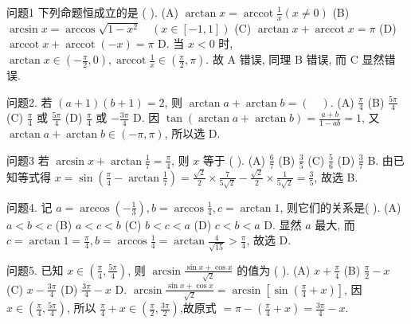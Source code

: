 
问题1 下列命题恒成立的是 ( ).
(A) $\arctan x=\operatorname{arccot} \frac{1}{x}(x \neq 0)$
(B) $\arcsin x=\arccos \sqrt{1-x^2} \quad(x \in[-1,1])$
(C) $\arctan x+\operatorname{arccot} x=\pi$
(D) $\operatorname{arccot} x+\operatorname{arccot}(-x)=\pi$
D. 当 $x<0$ 时, $\arctan x \in\left(-\frac{\pi}{2}, 0\right), \operatorname{arccot} \frac{1}{x} \in\left(\frac{\pi}{2}, \pi\right)$. 故 A 错误, 同理 B 错误, 而 C 显然错误.



问题2. 若 $(a+1)(b+1)=2$, 则 $\arctan a+\arctan b=(\quad)$.
(A) $\frac{\pi}{4}$
(B) $\frac{5 \pi}{4}$
(C) $\frac{\pi}{4}$ 或 $\frac{5 \pi}{4}$
(D) $\frac{\pi}{4}$ 或 $-\frac{3 \pi}{4}$
D. 因 $\tan (\arctan a+\arctan b)=\frac{a+b}{1-a b}=1$, 又 $\arctan a+\arctan b \in (-\pi, \pi)$, 所以选 D.



问题3 若 $\arcsin x+\arctan \frac{1}{7}=\frac{\pi}{4}$, 则 $x$ 等于 ( ).
(A) $\frac{6}{7}$
(B) $\frac{3}{5}$
(C) $\frac{5}{6}$
(D) $\frac{3}{7}$
B. 由已知等式得 $x=\sin \left(\frac{\pi}{4}-\arctan \frac{1}{7}\right)=\frac{\sqrt{2}}{2} \times \frac{7}{5 \sqrt{2}}-\frac{\sqrt{2}}{2} \times \frac{1}{5 \sqrt{2}}= \frac{3}{5}$, 故选 B.



问题4. 记 $a=\arccos \left(-\frac{1}{3}\right), b=\arccos \frac{1}{4}, c=\arctan 1$, 则它们的关系是( ).
(A) $a<b<c$
(B) $a<c<b$
(C) $b<c<a$
(D) $c<b<a$
D. 显然 $a$ 最大, 而 $c=\arctan 1=\frac{\pi}{4}, b=\arccos \frac{1}{4}=\arctan \frac{4}{\sqrt{15}}> \frac{\pi}{4}$, 故选 D.



问题5. 已知 $x \in\left(\frac{\pi}{4}, \frac{5 \pi}{4}\right)$, 则 $\arcsin \frac{\sin x+\cos x}{\sqrt{2}}$ 的值为 ( ).
(A) $x+\frac{\pi}{4}$
(B) $\frac{\pi}{2}-x$
(C) $x-\frac{3 \pi}{4}$
(D) $\frac{3 \pi}{4}-x$
D. $\arcsin \frac{\sin x+\cos x}{\sqrt{2}}=\arcsin \left[\sin \left(\frac{\pi}{4}+x\right)\right]$, 因 $x \in\left(\frac{\pi}{4}, \frac{5 \pi}{4}\right)$, 所以 $\frac{\pi}{4}+x \in\left(\frac{\pi}{2}, \frac{3 \pi}{2}\right)$,故原式 $=\pi-\left(\frac{\pi}{4}+x\right)=\frac{3 \pi}{4}-x$.



